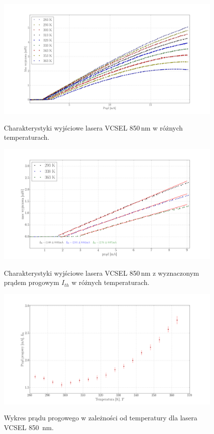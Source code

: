 \documentclass[a4paper, portrait,12pt]{report}
\begin{document}
\begin{figure}
\center
  \includegraphics[scale=0.30]{plot_vcsel850/plot_all.png}
  \label{rys1}
  \caption{Charakterystyki wyjściowe lasera VCSEL 850\,nm w różnych temperaturach.} 
\end{figure}
\begin{figure}
\center
  \includegraphics[scale=0.30]{plot_vcsel850/plot_3_i_th.png}
  \label{rys1}
  \caption{Charakterystyki wyjściowe lasera VCSEL 850\,nm z wyznaczonym prądem progowym $I_{th}$ w różnych temperaturach.} 
\end{figure}
\begin{figure}
\center
  \includegraphics[scale=0.30]{plot_vcsel850/plot_lin_i_th.png}
  \label{rys1}
  \caption{Wykres prądu progowego w zależności od temperatury dla lasera VCSEL 850 \,nm.} 
\end{figure}
\end{document}

